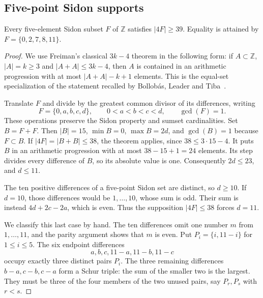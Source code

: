 \subsection{Five-point Sidon supports}

\begin{proposition}\label{five-sidon-size}
Every five-element Sidon subset $F$ of $\mathbb Z$ satisfies $|4F|\ge39$.
Equality is attained by $F=\{0,2,7,8,11\}$.
\end{proposition}
\begin{proof}
We use Freiman's classical $3k-4$ theorem in the following form:
if $A\subset\mathbb Z$, $|A|=k\ge3$ and $|A+A|\le3k-4$, then $A$
is contained in an arithmetic progression with at most
$|A+A|-k+1$ elements. This is the equal-set specialization of the
statement recalled by Bollob\'as, Leader and Tiba~\cite[p.~1]{blt}.

Translate $F$ and divide by the greatest common divisor of its
differences, writing
\[
 F=\{0,a,b,c,d\},\qquad 0<a<b<c<d,\qquad \gcd(F)=1.
\]
These operations preserve the Sidon property and sumset cardinalities.
Set $B=F+F$. Then $|B|=15$, $\min B=0$, $\max B=2d$, and
$\gcd(B)=1$ because $F\subset B$.
If $|4F|=|B+B|\le38$, the theorem applies, since $38\le3\cdot15-4$.
It puts $B$ in an arithmetic progression with at most $38-15+1=24$
elements. Its step divides every difference of $B$, so its absolute
value is one. Consequently $2d\le23$, and $d\le11$.

The ten positive differences of a five-point Sidon set are distinct,
so $d\ge10$. If $d=10$, those differences would be $1,\ldots,10$,
whose sum is odd. Their sum is instead $4d+2c-2a$, which is even.
Thus the supposition $|4F|\le38$ forces $d=11$.

We classify this last case by hand. The ten differences omit one number
$m$ from $1,\ldots,11$, and the parity argument shows that $m$ is even.
Put $P_i=\{i,11-i\}$ for $1\le i\le5$. The six endpoint differences
\[
 a,b,c,11-a,11-b,11-c
\]
occupy exactly three distinct pairs $P_i$. The three remaining
differences $b-a,c-b,c-a$ form a Schur triple: the sum of the smaller
two is the largest. They must be three of the four members of the two
unused pairs, say $P_r,P_s$ with $r<s$.


\end{proof}
